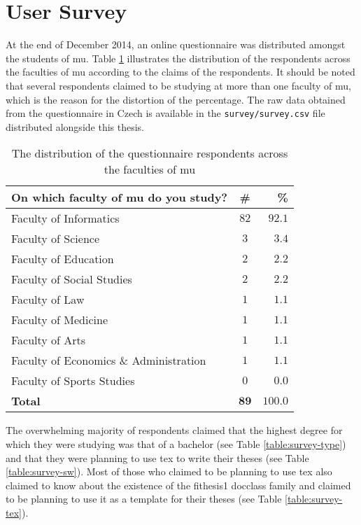 \documentclass[12pt,twoside,cover,color,table]%
  {fithesis3/fithesis3/fithesis3} %
\begin{document}
  \section{User Survey}
  At the end of December 2014, an online questionnaire was
  distributed amongst the students of \gls{mu}. Table
  \ref{table:survey-faculty} illustrates the distribution of the
  respondents across the faculties of \gls{mu} according to the
  claims of the respondents. It should be noted that several
  respondents claimed to be studying at more than one faculty of
  \gls{mu}, which is the reason for the distortion of the
  percentage. The raw data obtained from the questionnaire in Czech
  is available in the \texttt{survey/survey.csv} file distributed
  alongside this thesis.

  \begin{table}[!bt]
    \caption{The distribution of the questionnaire
      respondents across the faculties of \acrshort{mu}}
    \begin{tabularx}{\textwidth}{Xcr} \textbf{On which faculty of
      \gls{mu} do you study?} & \textbf{\#} & \textbf{\%}
      \\ \toprule Faculty of Informatics                  & $82$
      & $92.1$ \\ Faculty of Science                      &  $3$
      &  $3.4$ \\ Faculty of Education                    &  $2$
      &  $2.2$ \\ Faculty of Social Studies               &  $2$
      &  $2.2$ \\ Faculty of Law                          &  $1$
      &  $1.1$ \\ Faculty of Medicine                     &  $1$
      &  $1.1$ \\ Faculty of Arts                         &  $1$
      &  $1.1$ \\ Faculty of Economics \& Administration  &  $1$
      &  $1.1$ \\ Faculty of Sports Studies               &  $0$
      &  $0.0$ \\ \bottomrule \textbf{Total}      &$\mathbf{89}$
      & $\mathbf{100.0}$
    \end{tabularx}
    \label{table:survey-faculty}
  \end{table}

  The overwhelming majority of respondents claimed that the highest
  degree for which they were studying was that of a bachelor (see
  Table \ref{table:survey-type}) and that they were planning to use
  \gls{tex} to write their theses (see Table
  \ref{table:survey-sw}). Most of those who claimed to be planning
  to use \gls{tex} also claimed to know about the existence of the
  \textsf{fithesis1} \gls{docclass} family and claimed to be
  planning to use it as a template for their theses (see Table
  \ref{table:survey-tex}).
\end{document}
